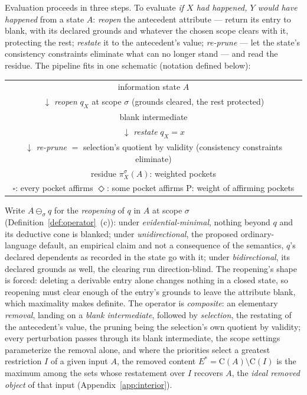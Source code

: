Evaluation proceeds in three steps. To evaluate \emph{if $X$ had happened, $Y$ would have happened} from a state $A$: \emph{reopen} the antecedent attribute --- return its entry to blank, with its declared grounds and whatever the chosen scope clears with it, protecting the rest; \emph{restate} it to the antecedent's value; \emph{re-prune} --- let the state's consistency constraints eliminate what can no longer stand --- and read the residue. The pipeline fits in one schematic (notation defined below):
\begin{center}
\renewcommand{\arraystretch}{1.15}
\begin{tabular}{c}
information state $A$\\
$\downarrow$ {\footnotesize \emph{reopen} $q_X$ at scope $\sigma$ (grounds cleared, the rest protected)}\\
blank intermediate\\
$\downarrow$ {\footnotesize \emph{restate} $q_X = x$}\\
$\downarrow$ {\footnotesize \emph{re-prune} $=$ selection's quotient by validity (consistency constraints eliminate)}\\
residue $\pi^{\sigma}_X(A)$: weighted pockets\\[2pt]
{\footnotesize $\square$: every pocket affirms \quad $\Diamond$: some pocket affirms \quad $\mathrm{P}$: weight of affirming pockets}
\end{tabular}
\end{center} Write $A \ominus_{\sigma} q$ for the \emph{reopening} of $q$ in $A$ at scope $\sigma$ (Definition~\ref{def:operator}~(c)): under \emph{evidential-minimal}, nothing beyond $q$ and its deductive cone is blanked; under \emph{unidirectional}, the proposed ordinary-language default, an empirical claim and not a consequence of the semantics, $q$'s declared dependents as recorded in the state go with it; under \emph{bidirectional}, its declared grounds as well, the clearing run direction-blind. The reopening's shape is forced: deleting a derivable entry alone changes nothing in a closed state, so reopening must clear enough of the entry's grounds to leave the attribute blank, which maximality makes definite. The operator is \emph{composite}: an elementary \emph{removal}, landing on a \emph{blank intermediate}, followed by \emph{selection}, the restating of the antecedent's value, the pruning being the selection's own quotient by validity; every perturbation passes through its blank intermediate, the scope settings parameterize the removal alone, and where the priorities select a greatest restriction $I$ of a given input $A$, the removed content $E^{*} = \mathrm{C}(A) \setminus \mathrm{C}(I)$ is the maximum among the sets whose restatement over $I$ recovers $A$, the \emph{ideal removed object} of that input (Appendix~\ref{app:interior}).
